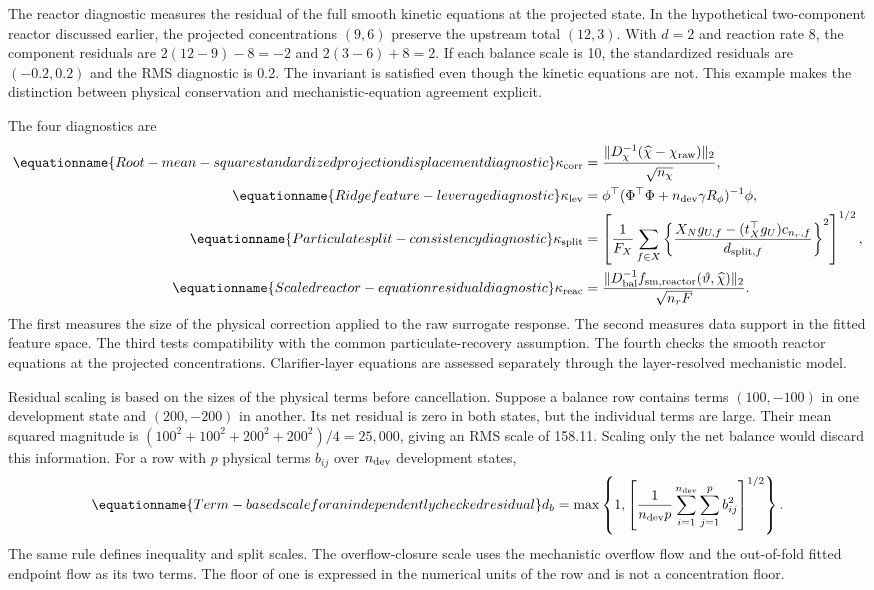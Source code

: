 The reactor diagnostic measures the residual of the full smooth kinetic equations at the projected state. In the hypothetical two-component reactor discussed earlier, the projected concentrations $(9,6)$ preserve the upstream total $(12,3)$. With $d=2$ and reaction rate 8, the component residuals are $2(12-9)-8=-2$ and $2(3-6)+8=2$. If each balance scale is 10, the standardized residuals are $(-0.2,0.2)$ and the RMS diagnostic is 0.2. The invariant is satisfied even though the kinetic equations are not. This example makes the distinction between physical conservation and mechanistic-equation agreement explicit.

The four diagnostics are
\begin{align}
\equationname{Root-mean-square standardized projection displacement diagnostic}
\kappa_{\rm corr}&=\frac{\|D_\chi^{-1}(\widehat\chi-\chi_{\rm raw})\|_2}{\sqrt{n_\chi}},\\
\equationname{Ridge feature-leverage diagnostic}
\kappa_{\rm lev}&=\phi^\top(\Phi^\top\Phi+n_{\rm dev}\gamma R_\phi)^{-1}\phi,\\
\equationname{Particulate split-consistency diagnostic}
\kappa_{\rm split}&=\left[\frac1{F_X}\sum_{f\in X}
\left\{\frac{X_Ng_{U,f}-(t_X^\top g_U)c_{n_r,f}}{d_{{\rm split},f}}\right\}^2\right]^{1/2},\\
\equationname{Scaled reactor-equation residual diagnostic}
\kappa_{\rm reac}&=\frac{\|D_{\rm bal}^{-1}f_{{\rm sm},\rm reactor}(\vartheta,\widehat\chi)\|_2}{\sqrt{n_rF}}.
\label{eq:plant_trust_diagnostics}
\end{align}
The first measures the size of the physical correction applied to the raw surrogate response. The second measures data support in the fitted feature space. The third tests compatibility with the common particulate-recovery assumption. The fourth checks the smooth reactor equations at the projected concentrations. Clarifier-layer equations are assessed separately through the layer-resolved mechanistic model.

Residual scaling is based on the sizes of the physical terms before cancellation. Suppose a balance row contains terms $(100,-100)$ in one development state and $(200,-200)$ in another. Its net residual is zero in both states, but the individual terms are large. Their mean squared magnitude is $(100^2+100^2+200^2+200^2)/4=25{,}000$, giving an RMS scale of 158.11. Scaling only the net balance would discard this information. For a row with $p$ physical terms $b_{ij}$ over $n_{\rm dev}$ development states,
\begin{equation}
\equationname{Term-based scale for an independently checked residual}
d_b=\max\left\{1,\left[\frac1{n_{\rm dev}p}
\sum_{i=1}^{n_{\rm dev}}\sum_{j=1}^{p}b_{ij}^2\right]^{1/2}\right\}.
\label{eq:plant_term_scales}
\end{equation}
The same rule defines inequality and split scales. The overflow-closure scale uses the mechanistic overflow flow and the out-of-fold fitted endpoint flow as its two terms. The floor of one is expressed in the numerical units of the row and is not a concentration floor.

